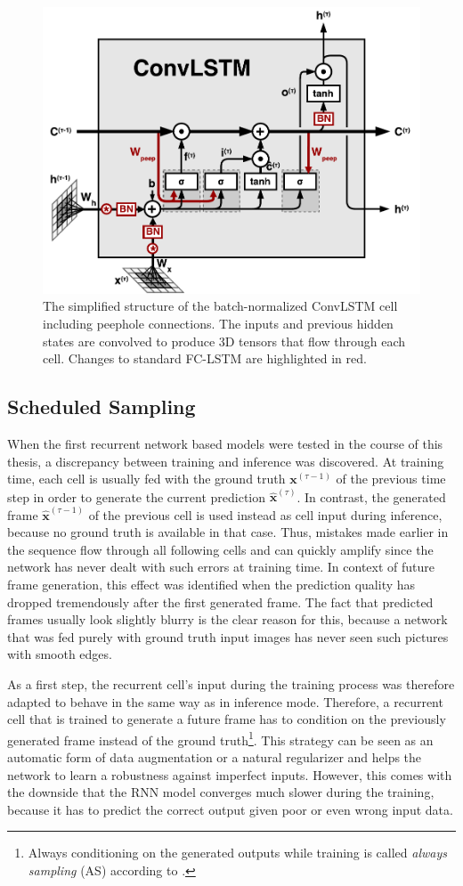 \begin{figure}[htpb]
	\centering
	\includegraphics[width=0.65\linewidth]{figures/convlstm.pdf} 
	\caption[ConvLSTM Cell]{The simplified structure of the batch-normalized ConvLSTM cell including peephole connections. The inputs and previous hidden states are convolved to produce 3D tensors that flow through each cell. Changes to standard FC-LSTM are highlighted in red.} \label{fig:convlstm-cell}
\end{figure}


\subsection{Scheduled Sampling} \label{sec:sched_sample}

When the first recurrent network based models were tested in the course of this thesis, a discrepancy between training and inference was discovered. At training time, each cell is usually fed with the ground truth $\textbf{x}^{(\tau-1)}$ of the previous time step in order to generate the current prediction $\hat{\textbf{x}}^{(\tau)}$. In contrast, the generated frame $ \hat{\textbf{x}}^{(\tau-1)}$ of the previous cell is used instead as cell input during inference, because no ground truth is available in that case. Thus, mistakes made earlier in the sequence flow through all following cells and can quickly amplify since the network has never dealt with such errors at training time. In context of future frame generation, this effect was identified when the prediction quality has dropped tremendously after the first generated frame. The fact that predicted frames usually look slightly blurry is the clear reason for this, because a network that was fed purely with ground truth input images has never seen such pictures with smooth edges.

As a first step, the recurrent cell's input during the training process was therefore adapted to behave in the same way as in inference mode. Therefore, a recurrent cell that is trained to generate a future frame has to condition on the previously generated frame instead of the ground truth\footnote{Always conditioning on the generated outputs while training is called \textit{always sampling} (AS) according to \parencite{sched_sample}.}. This strategy can be seen as an automatic form of data augmentation or a natural regularizer and helps the network to learn a robustness against imperfect inputs. However, this comes with the downside that the RNN model converges much slower during the training, because it has to predict the correct output given poor or even wrong input data.

